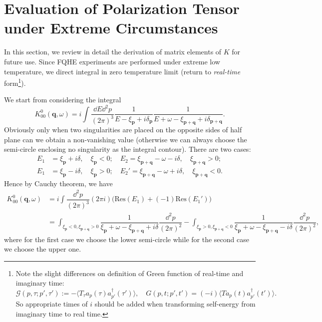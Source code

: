 \documentclass[bachelor,english,numbers]{ustcthesis}
\begin{document}
\chapter{Evaluation of Polarization Tensor under Extreme Circumstances}
	In this section, we review in detail the derivation of matrix elements of $K$ for future use. Since FQHE experiments are performed under extreme low temperature, we direct integral in zero temperature limit (return to \emph{real-time} form\footnote{Note the slight differences on definition of Green function of real-time and imaginary time:
	\begin{equation*}
		\mathcal{G}(p,\tau;p',\tau'):=-\langle T_\tau a_p(\tau) a_{p'}^\dagger(\tau')\rangle,\quad G(p,t;p',t')=(-i)\langle Ta_p(t) a_{p'}^\dagger(t')\rangle.
	\end{equation*}
	So appropriate times of $i$ should be added when transforming self-energy from imaginary time to real time.}).\par
	We start from considering the integral
	\begin{equation*}
		K^0_{00}(\bm{q},\omega)=i\int\dfrac{\dd E\dd^2p}{(2\pi)^3}\dfrac{1}{E-\xi_{\bm{p}}+i\delta_{\bm{p}}}\dfrac{1}{E+\omega-\xi_{\bm{p+q}}+i\delta_{\bm{p+q}}}.
	\end{equation*}
	Obviously only when two singularities are placed on the opposite sides of half plane can we obtain a non-vanishing value (otherwise we can always choose the semi-circle enclosing no singularity as the integral contour). There are two cases:
	\begin{align*}
		E_1&=\xi_{\bm{p}}+i\delta,\quad\xi_{\bm{p}}<0;\quad	E_2=\xi_{\bm{p+q}}-\omega-i\delta,\quad\xi_{\bm{p+q}}>0;\\
		E_1&=\xi_{\bm{p}}-i\delta,\quad\xi_{\bm{p}}>0;\quad E_2'=\xi_{\bm{p+q}}-\omega+i\delta,\quad\xi_{\bm{p+q}}<0.
	\end{align*}
	Hence by Cauchy theorem, we have
	\begin{align}
		K^0_{00}(\bm{q},\omega)&=i\int\dfrac{\dd^2p}{(2\pi)^3}(2\pi i)\bigg(\mathrm{Res}(E_1)+(-1)\mathrm{Res}(E_1')\bigg)\nonumber\\
		&=\int_{\xi_{\bm{p}}<0,\xi_{\bm{p+q}}>0}\dfrac{1}{\xi_{\bm{p}}+\omega-\xi_{\bm{p+q}}+i\delta}\dfrac{\dd^2p}{(2\pi)^2}-\int_{\xi_{\bm{p}}>0,\xi_{\bm{p+q}}<0}\dfrac{1}{\xi_{\bm{p}}+\omega-\xi_{\bm{p+q}}-i\delta}\dfrac{\dd^2p}{(2\pi)^2},\label{3.2.1}
	\end{align}
	where for the first case we choose the lower semi-circle while for the second case we choose the upper one.
\end{document}
